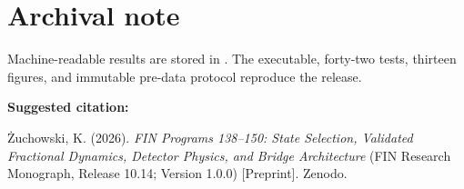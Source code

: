 \documentclass[11pt,a4paper,openany]{report}
\begin{document}
\clearpage
\chapter*{Archival note}
Machine-readable results are stored in
.
The executable, forty-two tests, thirteen figures, and immutable pre-data
protocol reproduce the release.

\medskip
\noindent\textbf{Suggested citation:}

\.Zuchowski, K. (2026). \emph{FIN Programs 138--150: State Selection,
Validated Fractional Dynamics, Detector Physics, and Bridge Architecture}
(FIN Research Monograph, Release 10.14; Version 1.0.0) [Preprint]. Zenodo.
\end{document}
